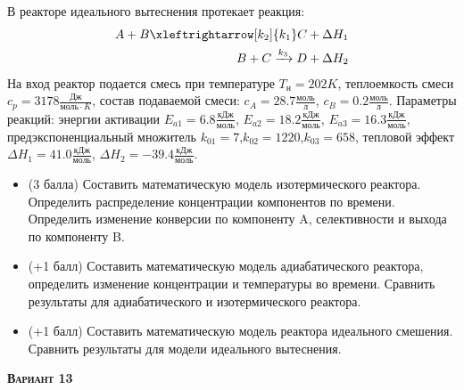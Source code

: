  В реакторе идеального вытеснения протекает реакция: \begin{equation*} \begin{aligned} A+B \xleftrightarrow[k_2]{k_1} C + \Delta H_1 \\ B + C \xrightarrow{k_3} D + \Delta H_2 \end{aligned} \end{equation*}                                На вход  реактор подается смесь при температуре $ T_н =  202 K$, теплоемкость смеси $c_p= 3178 \frac{Дж}{моль \cdot K}$, состав подаваемой смеси: $c_A=28.7 \frac{моль}{л}$, $c_B=0.2 \frac{моль}{л}$. Параметры реакций: энергии активации $E_{a1}= 6.8 \frac{кДж}{моль}$, $E_{a2}=18.2  \frac{кДж}{моль}$, $E_{a3}=16.3  \frac{кДж}{моль}$, предэкспоненциальный множитель $k_{01}=         7$,$k_{02}=      1220$,$k_{03}=       658$, тепловой эффект $\Delta H_1= 41.0  \frac{кДж}{моль}$, $\Delta H_2=-39.4 \frac{кДж}{моль}$.\begin{itemize} \item (3 балла) Составить математическую модель изотермического реактора. Определить распределение концентрации компонентов по времени. Определить изменение конверсии по компоненту A, селективности и выхода по компоненту B. \item (+1 балл) Составить математическую модель адиабатического реактора, определить изменение концентрации и температуры во времени. Сравнить результаты для адиабатического и изотермического реактора. \item (+1 балл) Составить математическую модель реактора идеального смешения. Сравнить результаты для модели идеального вытеснения. \end{itemize}

\textsc{\textbf{Вариант 13}}

